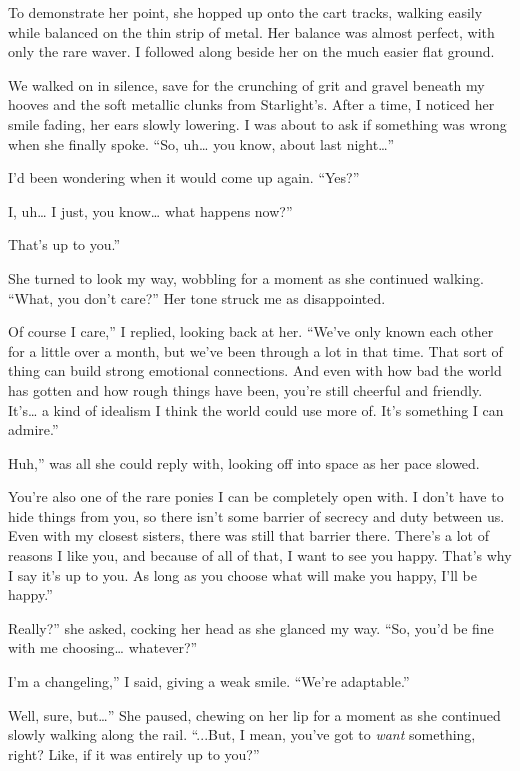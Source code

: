 To demonstrate her point, she hopped up onto the cart tracks, walking easily while balanced on the thin strip of metal. Her balance was almost perfect, with only the rare waver. I followed along beside her on the much easier flat ground.

We walked on in silence, save for the crunching of grit and gravel beneath my hooves and the soft metallic clunks from Starlight’s. After a time, I noticed her smile fading, her ears slowly lowering. I was about to ask if something was wrong when she finally spoke. “So, uh… you know, about last night…”

I’d been wondering when it would come up again. “Yes?”

\leavevmode{}I, uh… I just, you know… what happens now?”

\leavevmode{}That’s up to you.”

She turned to look my way, wobbling for a moment as she continued walking. “What, you don’t care?” Her tone struck me as disappointed.

\leavevmode{}Of course I care,” I replied, looking back at her. “We’ve only known each other for a little over a month, but we’ve been through a lot in that time. That sort of thing can build strong emotional connections. And even with how bad the world has gotten and how rough things have been, you’re still cheerful and friendly. It’s… a kind of idealism I think the world could use more of. It’s something I can admire.”

\leavevmode{}Huh,” was all she could reply with, looking off into space as her pace slowed.

\leavevmode{}You’re also one of the rare ponies I can be completely open with. I don’t have to hide things from you, so there isn’t some barrier of secrecy and duty between us. Even with my closest sisters, there was still that barrier there. There’s a lot of reasons I like you, and because of all of that, I want to see you happy. That’s why I say it’s up to you. As long as you choose what will make you happy, I’ll be happy.”

\leavevmode{}Really?” she asked, cocking her head as she glanced my way. “So, you’d be fine with me choosing… whatever?”

\leavevmode{}I’m a changeling,” I said, giving a weak smile. “We’re adaptable.”

\leavevmode{}Well, sure, but…” She paused, chewing on her lip for a moment as she continued slowly walking along the rail. “...But, I mean, you’ve got to \textit{want} something, right? Like, if it was entirely up to you?”

